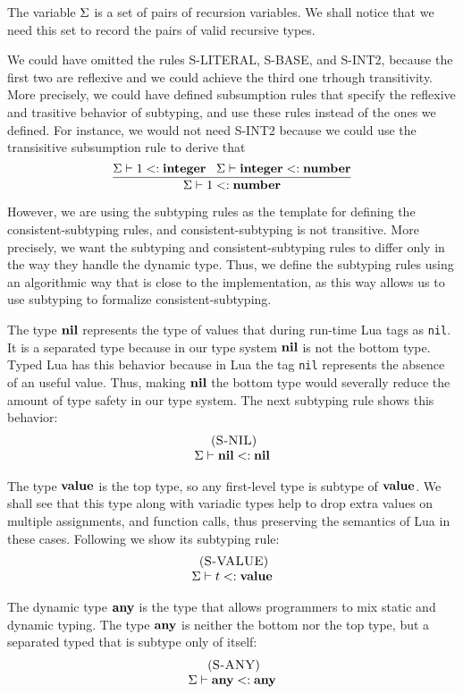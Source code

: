 The variable $\Sigma$ is a set of pairs of recursion variables.
We shall notice that we need this set to record the pairs of valid
recursive types.

We could have omitted the rules \textsc{S-LITERAL}, \textsc{S-BASE},
and \textsc{S-INT2}, because the first two are reflexive and we
could achieve the third one trhough transitivity.
More precisely, we could have defined subsumption rules that
specify the reflexive and trasitive behavior of subtyping,
and use these rules instead of the ones we defined.
For instance, we would not need \textsc{S-INT2} because we could
use the transisitive subsumption rule to derive that
\[
\dfrac{\Sigma \vdash 1 <: \mathbf{integer} \;\;\;
       \Sigma \vdash \mathbf{integer} <: \mathbf{number}}
      {\Sigma \vdash 1 <: \mathbf{number}}
\]

However, we are using the subtyping rules as the template for defining
the consistent-subtyping rules, and consistent-subtyping is not
transitive.
More precisely, we want the subtyping and consistent-subtyping rules
to differ only in the way they handle the dynamic type.
Thus, we define the subtyping rules using an algorithmic
way that is close to the implementation, as this way allows us to use
subtyping to formalize consistent-subtyping.

The type $\mathbf{nil}$ represents the type of values that during run-time
Lua tags as \texttt{nil}.
It is a separated type because in our type system $\mathbf{nil}$ is
not the bottom type.
Typed Lua has this behavior because in Lua the tag \texttt{nil}
represents the absence of an useful value.
Thus, making $\mathbf{nil}$ the bottom type would severally reduce the
amount of type safety in our type system.
The next subtyping rule shows this behavior:
\[
\begin{array}{c}
\; (\textsc{S-NIL})\\
\Sigma \vdash \mathbf{nil} <: \mathbf{nil}
\end{array}
\]

The type $\mathbf{value}$ is the top type, so any first-level type is
subtype of $\mathbf{value}$.
We shall see that this type along with variadic types help to
drop extra values on multiple assignments, and function calls,
thus preserving the semantics of Lua in these cases.
Following we show its subtyping rule:
\[
\begin{array}{c}
\; (\textsc{S-VALUE})\\
\Sigma \vdash t <: \mathbf{value}
\end{array}
\]

The dynamic type $\mathbf{any}$ is the type that allows programmers to mix
static and dynamic typing.
The type $\mathbf{any}$ is neither the bottom nor the top type, but a
separated typed that is subtype only of itself:
\[
\begin{array}{c}
\; (\textsc{S-ANY})\\
\Sigma \vdash \mathbf{any} <: \mathbf{any}
\end{array}
\]

